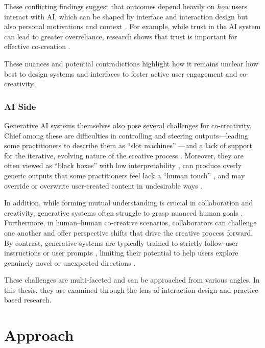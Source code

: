 These conflicting findings suggest that outcomes depend heavily on \emph{how} users interact with AI, which can be shaped by interface and interaction design but also personal motivations and context \cite{Lehmann2022-kr, Kantosalo2020-nh,Liapis2016-bv,Lin2023-jd,Karimi2020-cf,Moruzzi2024-cq, Rezwana2022-gg,Abbas2024-sf}. For example, while trust in the AI system can lead to greater overreliance, research shows that trust is important for effective co-creation \cite{McCormack2019-yh, Louie2020-aq, Kruger2017-xa, McCormack2020-ix, Hutchings2020-bv, Wang2020-cw, Rezwana2022-ui}. 

These nuances and potential contradictions highlight how it remains unclear how best to design systems and interfaces to foster active user engagement and co-creativity. 

\subsubsection{AI Side}
Generative AI systems themselves also pose several challenges for co-creativity. Chief among these are difficulties in controlling and steering outputs—leading some practitioners to describe them as “slot machines” \cite{Nebelong2023-rb}—and a lack of support for the iterative, evolving nature of the creative process \cite{Park2024-gw}. Moreover, they are often viewed as “black boxes” with low interpretability \cite{Llano2022-ti, El-Assady2022-qc}, can produce overly generic outputs that some practitioners feel lack a “human touch” \cite{Park2024-gw}, and may override or overwrite user-created content in undesirable ways \cite{Buschek2021-ks}.

In addition, while forming mutual understanding is crucial in collaboration and creativity, generative systems often struggle to grasp nuanced human goals \cite{Bown2024-yx}. Furthermore, in human–human co-creative scenarios, collaborators can challenge one another and offer perspective shifts that drive the creative process forward. By contrast, generative systems are typically trained to strictly follow user instructions \cite{OpenAI2022-pj} or user prompts \cite{Ramesh2022-kc}, limiting their potential to help users explore genuinely novel or unexpected directions \cite{Buschek2021-ks }.

These challenges are multi-faceted and can be approached from various angles. In this thesis, they are examined through the lens of interaction design and practice-based research. 

\section{Approach}

